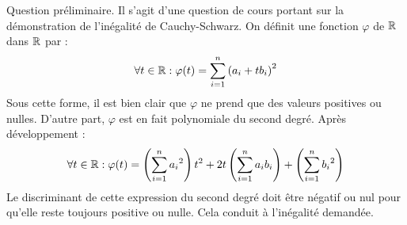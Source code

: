 Question préliminaire.\newline
Il s'agit d'une question de cours portant sur la démonstration de l'inégalité de Cauchy-Schwarz.\newline
On définit une fonction $\varphi$ de $\mathbb{R}$ dans $\mathbb{R}$ par :
\begin{displaymath}
 \forall t\in \mathbb{R} :
\varphi(t) = \sum_{i=1}^{n}\left( a_i + t b_i\right)^2 
\end{displaymath}
Sous cette forme, il est bien clair que $\varphi$ ne prend que des valeurs positives ou nulles. D'autre part, $\varphi$ est en fait polynomiale du second degré. Après développement :
\begin{displaymath}
 \forall t\in \mathbb{R} :
\varphi(t) = \left(\sum_{i=1}^{n} {a_i}^2\right)t^2 + 2t \left(\sum_{i=1}^{n} a_i b_i\right) + 
\left(\sum_{i=1}^{n} {b_i}^2\right) 
\end{displaymath}
 Le discriminant de cette expression du second degré doit être négatif ou nul pour qu'elle reste toujours positive ou nulle. Cela conduit à l'inégalité demandée.
